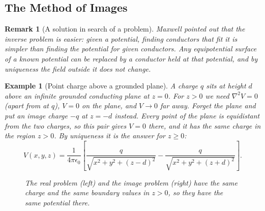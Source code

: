 \documentclass{article}
\newtheorem*{example}{Example}
\newtheorem{remark}{Remark}
\begin{document}
\subsection{The Method of Images}
\begin{remark}[A solution in search of a problem]
    Maxwell pointed out that the inverse problem is easier: given a potential, finding conductors that fit it is simpler than finding the potential for given conductors. Any equipotential surface of a known potential can be replaced by a conductor held at that potential, and by uniqueness the field outside it does not change.
\end{remark}
\begin{example}[Point charge above a grounded plane]
    A charge $q$ sits at height $d$ above an infinite grounded conducting plane at $z = 0$. For $z > 0$ we need $\nabla^2 V = 0$ (apart from at $q$), $V = 0$ on the plane, and $V \to 0$ far away. Forget the plane and put an image charge $-q$ at $z = -d$ instead. Every point of the plane is equidistant from the two charges, so this pair gives $V = 0$ there, and it has the same charge in the region $z > 0$. By uniqueness it is the answer for $z \geq 0$:
    \[V(x,y,z) = \frac{1}{4\pi\epsilon_0}\left[\frac{q}{\sqrt{x^2 + y^2 + (z-d)^2}} - \frac{q}{\sqrt{x^2 + y^2 + (z+d)^2}}\right].\]
    \begin{figure}[H]
        \centering
        \caption{The real problem (left) and the image problem (right) have the same charge and the same boundary values in $z > 0$, so they have the same potential there.}
    \end{figure}
\end{example}
\end{document}
